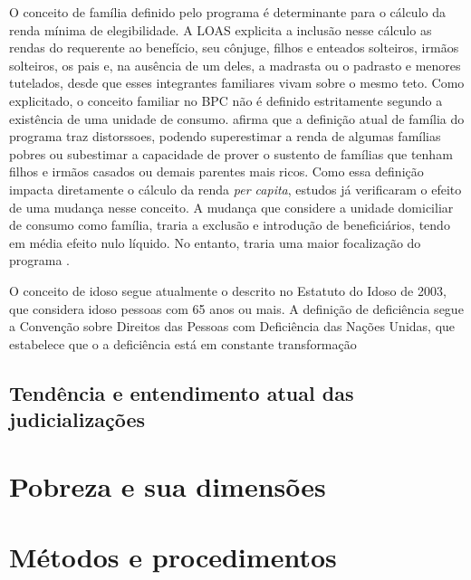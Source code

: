 \documentclass[
	12pt,				%
	openright,			%
	twoside,			%
	a4paper,			%
	english,			%
	french,				%
	spanish,			%
	brazil				%
	]{abntex2}
\begin{document}
		O conceito de família definido pelo programa é determinante para o cálculo da renda mínima de elegibilidade. A LOAS explicita a inclusão nesse cálculo as rendas do requerente ao benefício, seu cônjuge, filhos e enteados solteiros, irmãos solteiros, os pais e, na ausência de um deles, a madrasta ou o padrasto e menores tutelados, desde que esses integrantes familiares vivam sobre o mesmo teto. Como explicitado, o conceito familiar no BPC não é definido estritamente segundo a existência de uma unidade de consumo.  afirma que a definição atual de família do programa traz distorssoes, podendo superestimar a renda de algumas famílias pobres ou subestimar a capacidade de prover o sustento de famílias que tenham filhos e irmãos casados ou demais parentes mais ricos. Como essa definição impacta diretamente o cálculo da renda \textit{per capita}, estudos já verificaram o efeito de uma mudança nesse conceito. A mudança que considere a unidade domiciliar de consumo como família, traria a exclusão e introdução de beneficiários, tendo em média efeito nulo líquido. No entanto, traria uma maior focalização do programa \cite{medeiros2009mudancca,fambpcfreitas}.
		
		O conceito de idoso segue atualmente o descrito no Estatuto do Idoso de 2003, que considera idoso pessoas com 65 anos ou mais. A definição de deficiência segue a Convenção sobre Direitos das Pessoas com Deficiência das Nações Unidas, que estabelece que o a deficiência está em constante transformação 
		
		
		
		
		
\section{Tendência e entendimento atual das judicializações}

\chapter{Pobreza e sua dimensões}

\chapter{Métodos e procedimentos}
\end{document}
